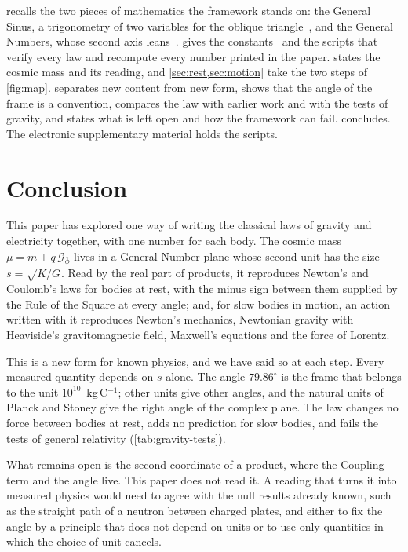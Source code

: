 \documentclass[11pt,a4paper]{article}
\newcommand{\Gp}{\mathcal{G}_{\bar{\phi}}}      %
\theoremstyle{plain}
\theoremstyle{definition}
\theoremstyle{remark}
\begin{document}
 recalls the two pieces of mathematics the framework stands on: the General Sinus, a trigonometry of two variables for the oblique triangle~\citep{Derraz2026GSP}, and the General Numbers, whose second axis leans~\citep{DerrazGN2026}.  gives the constants~\citep{CODATA2022} and the scripts that verify every law and recompute every number printed in the paper.  states the cosmic mass and its reading, and \cref{sec:rest,sec:motion} take the two steps of \cref{fig:map}.  separates new content from new form, shows that the angle of the frame is a convention, compares the law with earlier work and with the tests of gravity, and states what is left open and how the framework can fail.  concludes. The electronic supplementary material holds the scripts.








\section{Conclusion}\label{sec:conclusion}

This paper has explored one way of writing the classical laws of gravity and electricity together, with one number for each body. The cosmic mass $\mu = m + q\,\Gp$ lives in a General Number plane whose second unit has the size $s = \sqrt{K/G}$. Read by the real part of products, it reproduces Newton's and Coulomb's laws for bodies at rest, with the minus sign between them supplied by the Rule of the Square at every angle; and, for slow bodies in motion, an action written with it reproduces Newton's mechanics, Newtonian gravity with Heaviside's gravitomagnetic field, Maxwell's equations and the force of Lorentz.

This is a new form for known physics, and we have said so at each step. Every measured quantity depends on $s$ alone. The angle $79.86^\circ$ is the frame that belongs to the unit $10^{10}$~kg\,C$^{-1}$; other units give other angles, and the natural units of Planck and Stoney give the right angle of the complex plane. The law changes no force between bodies at rest, adds no prediction for slow bodies, and fails the tests of general relativity (\cref{tab:gravity-tests}).

What remains open is the second coordinate of a product, where the Coupling term and the angle live. This paper does not read it. A reading that turns it into measured physics would need to agree with the null results already known, such as the straight path of a neutron between charged plates, and either to fix the angle by a principle that does not depend on units or to use only quantities in which the choice of unit cancels.
\end{document}
